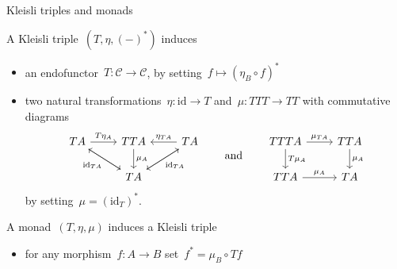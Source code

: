 \documentclass[notes]{beamer}
\newcommand{\cat}[1]{\mathcal{#1}}
\newcommand{\id}{\mathrm{id}}
\begin{document}
\begin{frame}[fragile]{Kleisli triples and monads}
    \begin{theorem}
        A Kleisli triple~\((T,\eta,(-)^{\ast})\) induces
        \begin{itemize}
            \item an endofunctor~\(T:\cat{C}\rightarrow\cat{C}\),
                by setting~\(f\mapsto(\eta_{B}\circ f)^{\ast}\)

            \item two natural transformations~\(\eta:\id\rightarrow T\)
                and~\(\mu:TTT\rightarrow TT\) with commutative diagrams
                \[
                    \begin{tikzcd}
                        TA \arrow{r}{T\eta_{A}} \arrow{dr}{} & TTA \arrow{d}{\mu_{A}} & TA \arrow{l}[swap]{\eta_{TA}} \arrow{dl}{} \\
                                                             & TA \arrow{ul}{\id_{TA}} \arrow{ur}[swap]{\id_{TA}} &
                    \end{tikzcd}
                    \qquad\text{and}\qquad
                    \begin{tikzcd}
                        TTTA \arrow{r}{\mu_{TA}} \arrow{d}{T\mu_{A}} & TTA \arrow{d}{\mu_{A}} \\
                        TTA \arrow{r}{\mu_{A}} & TA
                    \end{tikzcd}
                \]
                by setting~\(\mu=(\id_{T})^{\ast}\).
        \end{itemize}
    \end{theorem}


    \pause

    \begin{theorem}
        A monad~\((T,\eta,\mu)\) induces a Kleisli triple
        \begin{itemize}
            \item for any morphism~\(f:A\rightarrow B\)
                set~\(f^{\ast}=\mu_{B}\circ Tf\)
        \end{itemize}
    \end{theorem}

\end{frame}
\end{document}
